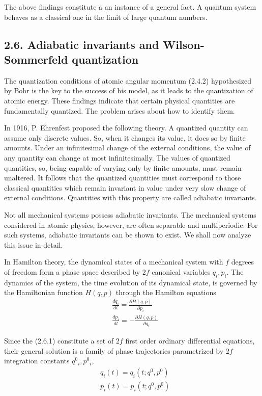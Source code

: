 \documentclass{article}
\begin{document}
The above findings constitute a an instance of a general fact.
A quantum system behaves as a classical one in the limit of large quantum numbers.

\subsection*{2.6. Adiabatic invariants and Wilson-Sommerfeld quantization}

The quantization conditions of atomic angular momentum (2.4.2) hypothesized by Bohr is the key to the success of his model, as it leads to the quantization of atomic energy. These findings indicate that certain physical quantities are fundamentally quantized. The problem arises about how to identify them.

In 1916, P. Ehrenfest proposed the following theory. A quantized quantity can assume only discrete values. So, when it changes its value, it does so by finite amounts. Under an infinitesimal change of the external conditions, the value of any quantity can change at most infinitesimally. The values of quantized quantities, so, being capable of varying only by finite amounts, must remain unaltered. It follows that the quantized quantities must correspond to those classical quantities which remain invariant in value under very slow change of external conditions. Quantities with this property are called adiabatic invariants.

Not all mechanical systems possess adiabatic invariants. The mechanical systems considered in atomic physics, however, are often separable and multiperiodic. For such systems, adiabatic invariants can be shown to exist. We shall now analyze this issue in detail.

In Hamilton theory, the dynamical states of a mechanical system with $f$ degrees of freedom form a phase space described by $2 f$ canonical variables $q_{i}, p_{i}$. The dynamics of the system, the time evolution of its dynamical state, is governed by the Hamiltonian function $H(q, p)$ through the Hamilton equations
$$
\begin{align*}
& \frac{d q_{i}}{d t}=\frac{\partial H(q, p)}{\partial p_{i}}  \tag{2.6.1a}\\
& \frac{d p_{i}}{d t}=-\frac{\partial H(q, p)}{\partial q_{i}} \tag{2.6.1b}
\end{align*}
$$

Since the (2.6.1) constitute a set of $2 f$ first order ordinary differential equations, their general solution is a family of phase trajectories parametrized by $2 f$ integration constants $q^{0}{ }_{i}, p^{0}{ }_{i}$,
$$
\begin{align*}
& q_{i}(t)=q_{i}\left(t ; q^{0}, p^{0}\right)  \tag{2.6.2a}\\
& p_{i}(t)=p_{i}\left(t ; q^{0}, p^{0}\right) \tag{2.6.2~b}
\end{align*}
$$
\end{document}
